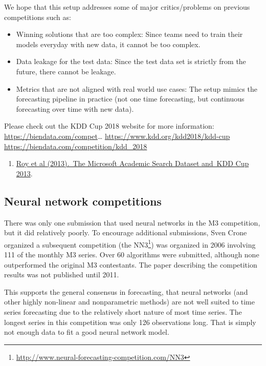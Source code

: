 \documentclass[11pt,a4paper,]{article}
\providecommand{\tightlist}{%
  \setlength{\itemsep}{0pt}\setlength{\parskip}{0pt}}
\begin{document}
We hope that this setup addresses some of major critics/problems on previous competitions such as:

\begin{itemize}
\tightlist
\item
  Winning solutions that are too complex: Since teams need to train their models everyday with new data, it cannot be too complex.
\item
  Data leakage for the test data: Since the test data set is strictly from the future, there cannot be leakage.
\item
  Metrics that are not aligned with real world use cases: The setup mimics the forecasting pipeline in practice (not one time forecasting, but continuous forecasting over time with new data).
\end{itemize}

Please check out the KDD Cup 2018 website for more information: \url{https://biendata.com/compet}\ldots{}
\url{https://www.kdd.org/kdd2018/kdd-cup}
\url{https://biendata.com/competition/kdd_2018}

\begin{enumerate}
\def\labelenumi{\arabic{enumi}.}
\setcounter{enumi}{1}
\tightlist
\item
  \href{http://www.kdd.org/kddcup2013/sites/default/files/papers/papers.pdf}{Roy et al (2013).~The Microsoft Academic Search Dataset and~KDD Cup 2013}.
\end{enumerate}

\hypertarget{neural-network-competitions}{%
\subsection*{Neural network competitions}\label{neural-network-competitions}}

There was only one submission that used neural networks in the M3 competition, but it did relatively poorly. To encourage additional submissions, Sven Crone organized a subsequent competition (the NN3\footnote{\url{http://www.neural-forecasting-competition.com/NN3}}) was organized in 2006 involving 111 of the monthly M3 series. Over 60 algorithms were submitted, although none outperformed the original M3 contestants. The paper describing the competition results \autocite{NN3} was not published until 2011.

This supports the general consensus in forecasting, that neural networks (and other highly non-linear and nonparametric methods) are not well suited to time series forecasting due to the relatively short nature of most time series. The longest series in this competition was only 126 observations long. That is simply not enough data to fit a good neural network model.
\end{document}
